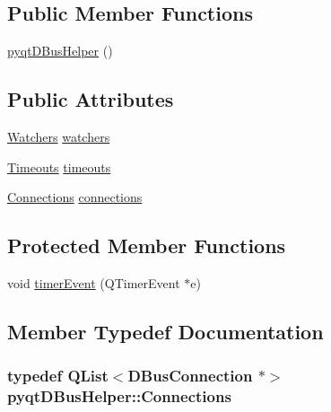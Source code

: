 \subsection*{Public Member Functions}
\begin{DoxyCompactItemize}
\item 
\hyperlink{classpyqtDBusHelper_ac236edb59a2a60aa4987e99e8e5ca77c}{pyqt\+D\+Bus\+Helper} ()
\end{DoxyCompactItemize}
\subsection*{Public Attributes}
\begin{DoxyCompactItemize}
\item 
\hyperlink{classpyqtDBusHelper_adceae209848ccda24b4293514b21ff89}{Watchers} \hyperlink{classpyqtDBusHelper_ad44628fa4d5ce7d89fcb12958575c4c9}{watchers}
\item 
\hyperlink{classpyqtDBusHelper_a4498e052c335cc2ce0c85de747e25715}{Timeouts} \hyperlink{classpyqtDBusHelper_adc620fa04632f1905432646cb2663b78}{timeouts}
\item 
\hyperlink{classpyqtDBusHelper_ae87f85025dbf64fffa05073e6c11a09d}{Connections} \hyperlink{classpyqtDBusHelper_aa69941e5b02975e4e6d3c9a4cc6cf9dc}{connections}
\end{DoxyCompactItemize}
\subsection*{Protected Member Functions}
\begin{DoxyCompactItemize}
\item 
void \hyperlink{classpyqtDBusHelper_a64c2dd8600c95360fedb9254981d7fc7}{timer\+Event} (Q\+Timer\+Event $\ast$e)
\end{DoxyCompactItemize}


\subsection{Member Typedef Documentation}
\hypertarget{classpyqtDBusHelper_ae87f85025dbf64fffa05073e6c11a09d}{}
\subsubsection[{Connections}]{\setlength{\rightskip}{0pt plus 5cm}typedef {\bf Q\+List}$<$D\+Bus\+Connection $\ast$$>$ {\bf pyqt\+D\+Bus\+Helper\+::\+Connections}}\label{classpyqtDBusHelper_ae87f85025dbf64fffa05073e6c11a09d}
\hypertarget{classpyqtDBusHelper_a4498e052c335cc2ce0c85de747e25715}{}
